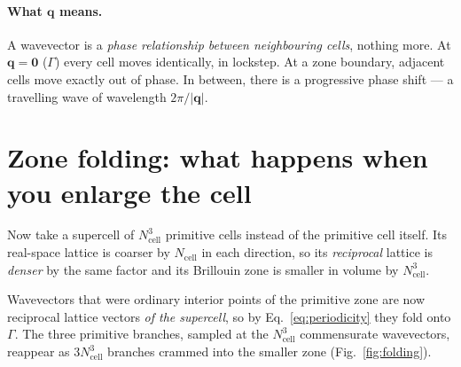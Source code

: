 \documentclass[11pt]{article}
\begin{document}
\paragraph{What $\bm q$ means.} A wavevector is a \emph{phase relationship
between neighbouring cells}, nothing more. At $\bm q = \bm 0$ ($\Gamma$) every
cell moves identically, in lockstep. At a zone boundary, adjacent cells move
exactly out of phase. In between, there is a progressive phase shift --- a
travelling wave of wavelength $2\pi/|\bm q|$.

\section{Zone folding: what happens when you enlarge the cell}

Now take a supercell of $N_{\mathrm{cell}}^3$ primitive cells instead of the
primitive cell itself. Its real-space lattice is coarser by $N_{\mathrm{cell}}$
in each direction, so its \emph{reciprocal} lattice is \emph{denser} by the same
factor and its Brillouin zone is smaller in volume by $N_{\mathrm{cell}}^3$.

Wavevectors that were ordinary interior points of the primitive zone are now
reciprocal lattice vectors \emph{of the supercell}, so by
Eq.~\eqref{eq:periodicity} they fold onto $\Gamma$. The three primitive branches,
sampled at the $N_{\mathrm{cell}}^3$ commensurate wavevectors, reappear as
$3N_{\mathrm{cell}}^3$ branches crammed into the smaller zone
(Fig.~\ref{fig:folding}).
\end{document}
